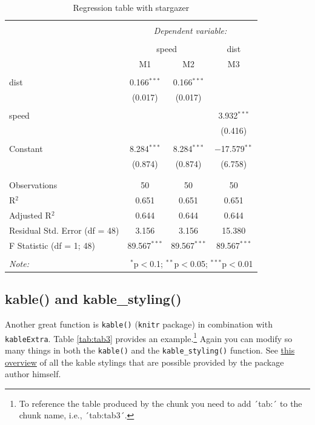 \documentclass[12pt,]{article}
\let\rmarkdownfootnote\footnote%
\def\footnote{\protect\rmarkdownfootnote}
\theoremstyle{definition}
\theoremstyle{definition}
\theoremstyle{definition}
\theoremstyle{remark}
\begin{document}
\begin{table}[H] \centering 
  \caption{Regression table with stargazer} 
  \label{tab2} 
\begin{tabular}{@{\extracolsep{5pt}}lccc} 
\\[-1.8ex]\hline 
\hline \\[-1.8ex] 
 & \multicolumn{3}{c}{\textit{Dependent variable:}} \\ 
\cline{2-4} 
\\[-1.8ex] & \multicolumn{2}{c}{speed} & dist \\ 
 & M1 & M2 & M3 \\ 
\hline \\[-1.8ex] 
 dist & 0.166$^{***}$ & 0.166$^{***}$ &  \\ 
  & (0.017) & (0.017) &  \\ 
  & & & \\ 
 speed &  &  & 3.932$^{***}$ \\ 
  &  &  & (0.416) \\ 
  & & & \\ 
 Constant & 8.284$^{***}$ & 8.284$^{***}$ & $-$17.579$^{**}$ \\ 
  & (0.874) & (0.874) & (6.758) \\ 
  & & & \\ 
\hline \\[-1.8ex] 
Observations & 50 & 50 & 50 \\ 
R$^{2}$ & 0.651 & 0.651 & 0.651 \\ 
Adjusted R$^{2}$ & 0.644 & 0.644 & 0.644 \\ 
Residual Std. Error (df = 48) & 3.156 & 3.156 & 15.380 \\ 
F Statistic (df = 1; 48) & 89.567$^{***}$ & 89.567$^{***}$ & 89.567$^{***}$ \\ 
\hline 
\hline \\[-1.8ex] 
\textit{Note:}  & \multicolumn{3}{r}{$^{*}$p$<$0.1; $^{**}$p$<$0.05; $^{***}$p$<$0.01} \\ 
\end{tabular} 
\end{table}

\subsection{kable() and kable\_styling()}\label{kable-and-kable_styling}

Another great function is \texttt{kable()} (\texttt{knitr} package) in
combination with \texttt{kableExtra}. Table \ref{tab:tab3} provides an
example.\footnote{To reference the table produced by the chunk you need
  to add ´tab:´ to the chunk name, i.e., ´tab:tab3´.} Again you can
modify so many things in both the \texttt{kable()} and the
\texttt{kable\_styling()} function. See
\href{https://haozhu233.github.io/kableExtra/awesome_table_in_pdf.pdf}{this
overview} of all the kable stylings that are possible provided by the
package author himself.
\end{document}

